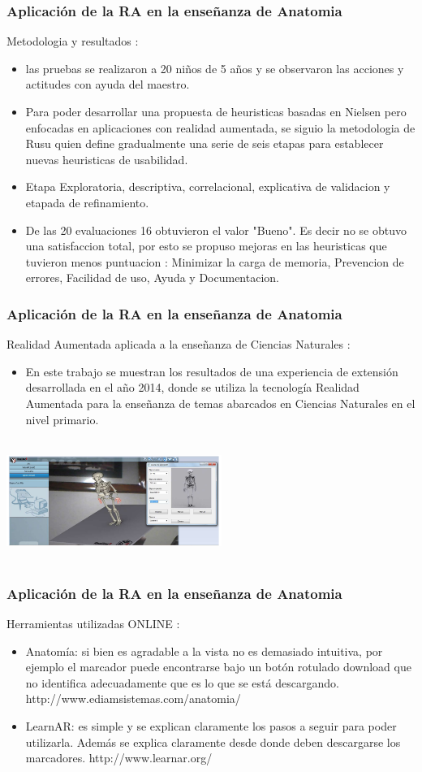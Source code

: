 \documentclass[11pt]{beamer}
\begin{document}
\begin{frame}
\frametitle{Aplicación de la RA en la enseñanza de Anatomia}
\center Metodologia y resultados : 
\begin{itemize}
\item las pruebas se realizaron a 20 niños de 5 años y se observaron las acciones y actitudes con ayuda del maestro.
\item Para poder desarrollar una propuesta de heuristicas basadas en Nielsen pero enfocadas en aplicaciones con realidad aumentada, se siguio la metodologia de Rusu quien define gradualmente una serie de seis etapas para establecer nuevas heuristicas de usabilidad.
\item Etapa Exploratoria, descriptiva, correlacional, explicativa de validacion y etapada de refinamiento.
\item De las 20 evaluaciones 16 obtuvieron el valor "Bueno". Es decir no se obtuvo una satisfaccion total, por esto se propuso mejoras en las heuristicas que tuvieron menos puntuacion : Minimizar la carga de memoria, Prevencion de errores, Facilidad de uso, Ayuda y Documentacion.
\end{itemize}
\end{frame}


\begin{frame}
\frametitle{Aplicación de la RA en la enseñanza de Anatomia }
\center Realidad Aumentada aplicada a la
enseñanza de Ciencias Naturales : 
\center
\begin{itemize}
\item En este trabajo se muestran los resultados de una experiencia de extensión desarrollada en el año 2014, donde se utiliza la tecnología Realidad Aumentada para la enseñanza de temas abarcados en Ciencias Naturales en el nivel primario.
\end{itemize}
\includegraphics[width=7cm, height=4cm]{img/sistema_oseo.png}
\end{frame}


\begin{frame}
\frametitle{Aplicación de la RA en la enseñanza de Anatomia}
\center Herramientas utilizadas ONLINE  : 
\center
\begin{itemize}
\item Anatomía: si bien es agradable a la vista no es demasiado intuitiva, por ejemplo el marcador puede encontrarse bajo un botón rotulado download que no identifica adecuadamente que es lo que se está descargando. http://www.ediamsistemas.com/anatomia/ 
\item LearnAR: es simple y se explican
claramente los pasos a seguir para poder utilizarla. Además se explica claramente desde donde deben descargarse los marcadores. http://www.learnar.org/ 
\end{itemize}
\end{frame}
\end{document}
